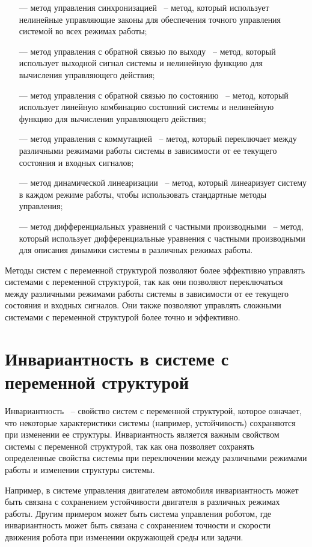  \begin{enumerate}
\item[—] метод управления синхронизацией~\cite{8} -- метод, который использует нелинейные управляющие законы для обеспечения точного управления системой во всех режимах работы;
\item[—] метод управления с обратной связью по выходу~\cite{9}  -- метод, который использует выходной сигнал системы и нелинейную функцию для вычисления управляющего действия;
\item[—] метод управления с обратной связью по состоянию~\cite{10} -- метод, который использует линейную комбинацию состояний системы и нелинейную функцию для вычисления управляющего действия;
\item[—] метод управления с коммутацией~\cite{11} -- метод, который переключает между различными режимами работы системы в зависимости от ее текущего состояния и входных сигналов;
\item[—] метод динамической линеаризации~\cite{12} -- метод, который линеаризует систему в каждом режиме работы, чтобы использовать стандартные методы управления;
\item[—] метод дифференциальных уравнений с частными производными~\cite{13} -- метод, который использует дифференциальные уравнения с частными производными для описания динамики системы в различных режимах работы.
\end{enumerate}

Методы систем с переменной структурой позволяют более эффективно управлять системами с переменной структурой, так как они позволяют переключаться между различными режимами работы системы в зависимости от ее текущего состояния и входных сигналов. Они также позволяют управлять сложными системами с переменной структурой более точно и эффективно.

\section{Инвариантность в системе с переменной структурой}

 Инвариантность~\cite{14} -- свойство систем с переменной структурой, которое означает, что некоторые характеристики системы (например, устойчивость) сохраняются при изменении ее структуры. Инвариантность является важным свойством системы с переменной структурой, так как она позволяет сохранять определенные свойства системы при переключении между различными режимами работы и изменении структуры системы.

Например, в системе управления двигателем автомобиля инвариантность может быть связана с сохранением устойчивости двигателя в различных режимах работы. Другим примером может быть система управления роботом, где инвариантность может быть связана с сохранением точности и скорости движения робота при изменении окружающей среды или задачи.

